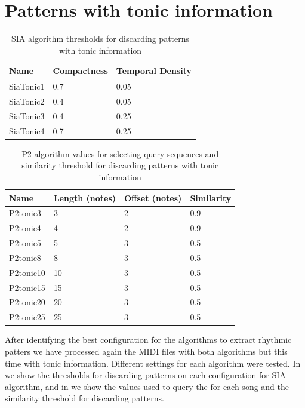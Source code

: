 \documentclass{article}
\begin{document}
\section{Patterns with tonic information}


\begin{table}
 \begin{center}
 \begin{tabular}{|l|l|l|}
  \hline
  Name & Compactness & Temporal Density \\
  \hline
  SiaTonic1 & 0.7 & 0.05 \\
  \hline
  SiaTonic2 & 0.4 & 0.05 \\
  \hline
  SiaTonic3 & 0.4 & 0.25 \\
  \hline
  SiaTonic4 & 0.7 & 0.25 \\
  \hline
 \end{tabular}
\end{center}
 \caption{SIA algorithm thresholds for discarding patterns with tonic information}
 \label{siatonic}
\end{table}


\begin{table}
 \begin{center}
 \begin{tabular}{|l|l|l|l|}
  \hline
  Name & Length (notes) & Offset (notes) & Similarity  \\
  \hline
  P2tonic3 & 3 & 2 & 0.9 \\
  \hline
  P2tonic4 & 4 & 2 & 0.9 \\
  \hline
  P2tonic5 & 5 & 3 & 0.5 \\
  \hline
  P2tonic8 & 8 & 3 & 0.5 \\
  \hline
  P2tonic10 & 10 & 3 & 0.5 \\
  \hline
  P2tonic15 & 15 & 3 & 0.5 \\
  \hline
  P2tonic20 & 20 & 3 & 0.5 \\
  \hline
  P2tonic25 & 25 & 3 & 0.5 \\
  \hline
 \end{tabular}
\end{center}
 \caption{P2 algorithm values for selecting query sequences and similarity threshold for discarding patterns with tonic information}
 \label{p2tonic}
\end{table}

After identifying the best configuration for the algorithms to extract rhythmic patters we have processed again the MIDI files with both algorithms but this time with tonic information. Different settings for each algorithm were tested. In  we show the thresholds for discarding patterns on each configuration for SIA algorithm, and in  we show the values used to query the for each song and the similarity threshold for discarding patterns.
\end{document}
